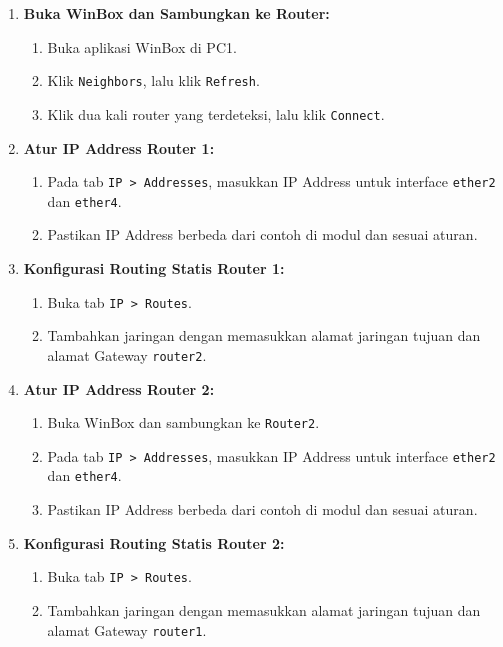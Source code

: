 \begin{enumerate}
    \item \textbf{Buka WinBox dan Sambungkan ke Router:}
    \begin{enumerate}
        \item Buka aplikasi WinBox di PC1.
        \item Klik \texttt{Neighbors}, lalu klik \texttt{Refresh}.
        \item Klik dua kali router yang terdeteksi, lalu klik \texttt{Connect}.
    \end{enumerate}
    
    \item \textbf{Atur IP Address Router 1:}
    \begin{enumerate}
        \item Pada tab \texttt{IP > Addresses}, masukkan IP Address untuk interface \texttt{ether2} dan \texttt{ether4}.
        \item Pastikan IP Address berbeda dari contoh di modul dan sesuai aturan.
    \end{enumerate}
    
    \item \textbf{Konfigurasi Routing Statis Router 1:}
    \begin{enumerate}
        \item Buka tab \texttt{IP > Routes}.
        \item Tambahkan jaringan dengan memasukkan alamat jaringan tujuan dan alamat Gateway \texttt{router2}.
    \end{enumerate}
    
    \item \textbf{Atur IP Address Router 2:}
    \begin{enumerate}
        \item Buka WinBox dan sambungkan ke \texttt{Router2}.
        \item Pada tab \texttt{IP > Addresses}, masukkan IP Address untuk interface \texttt{ether2} dan \texttt{ether4}.
        \item Pastikan IP Address berbeda dari contoh di modul dan sesuai aturan.
    \end{enumerate}
    
    \item \textbf{Konfigurasi Routing Statis Router 2:}
    \begin{enumerate}
        \item Buka tab \texttt{IP > Routes}.
        \item Tambahkan jaringan dengan memasukkan alamat jaringan tujuan dan alamat Gateway \texttt{router1}.
    \end{enumerate}
    

\end{enumerate}
